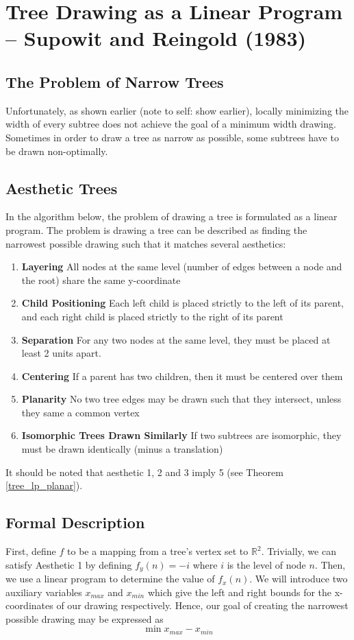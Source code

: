 \documentclass[11pt]{report}
\begin{document}
\section{Tree Drawing as a Linear Program -- Supowit and Reingold (1983)}
\subsection{The Problem of Narrow Trees}
Unfortunately, as shown earlier (note to self: show earlier), locally minimizing the width of every subtree does not achieve the goal of a minimum width drawing. Sometimes in order to draw a tree as narrow as possible, some subtrees have to be drawn non-optimally.

\subsection{Aesthetic Trees}

In the algorithm below, the problem of drawing a tree is formulated as a linear program. The problem is drawing a tree can be described as finding the narrowest possible drawing such that it matches several aesthetics:
\begin{enumerate}
    \item \textbf{Layering} All nodes at the same level (number of edges between a node and the root) share the same y-coordinate
    \item \textbf{Child Positioning} Each left child is placed strictly to the left of its parent, and each right child is placed strictly to the right of its parent
    \item \textbf{Separation} For any two nodes at the same level, they must be placed at least 2 units apart.
    \item \textbf{Centering} If a parent has two children, then it must be centered over them
    \item \textbf{Planarity} No two tree edges may be drawn such that they intersect, unless they same a common vertex
    \item \textbf{Isomorphic Trees Drawn Similarly} If two subtrees are isomorphic, they must be drawn identically (minus a translation)
\end{enumerate}

It should be noted that aesthetic 1, 2 and 3 imply 5 (see Theorem \ref{tree_lp_planar}).

\subsection{Formal Description}
First, define $f$ to be a mapping from a tree's vertex set to $\mathbb{R}^2$. Trivially, we can satisfy Aesthetic 1 by defining $f_y(n) = -i$ where $i$ is the level of node $n$. Then, we use a linear program to determine the value of $f_x(n)$. We will introduce two auxiliary variables $x_{max}$ and $x_{min}$ which give the left and right bounds for the x-coordinates of our drawing respectively. Hence, our goal of creating the narrowest possible drawing may be expressed as 
\[
\min{x_{max} - x_{min}}
\]
\end{document}
